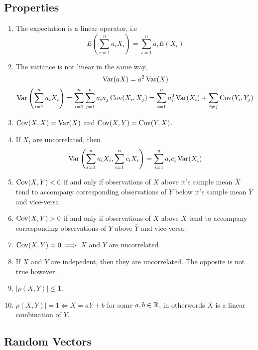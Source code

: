\subsection{Properties}
\begin{enumerate}[label=(\roman*)]
    \item The expectation is a linear operator, i.e 
    \[E\left(\sum_{i=1}^n a_iX_i\right) = \sum_{i=1}^n a_iE(X_i)\]
    \item The variance is not linear in the same way, 
    \[\operatorname{Var}(aX) = a^2\operatorname{Var}(X)\]
    \[\operatorname{Var}\left(\sum_{i=1}^n a_iX_i\right) = \sum_{i=1}^n\sum_{j=1}^n a_ia_j\operatorname{Cov}(X_i, X_j) =  \sum_{i=1}^na_i^2\operatorname{Var}(X_i) + \sum_{i\neq j}\operatorname{Cov}(Y_i,Y_j)\]
    \item $\operatorname{Cov}(X,X) = \operatorname{Var}(X)$ and $\operatorname{Cov}(X,Y) = \operatorname{Cov}(Y,X)$.
    \item If $X_i$ are uncorrelated, then 
    \[\operatorname{Var}\left(\sum_{i=1}^n a_iX_i, \sum_{i=1}^n c_iX_i\right) = \sum_{i=1}^na_ic_i\operatorname{Var}(X_i)\]
    \item $\operatorname{Cov}(X,Y) < 0$ if and only if observations of $X$ above it's sample mean $\bar{X}$ tend to accompany corresponding observations of $Y$ below it's sample mean $\bar{Y}$ and vice-versa. 
    \item $\operatorname{Cov}(X,Y) > 0$ if and only if observations of $X$ above $\bar{X}$ tend to accompany corresponding observations of $Y$ above $\bar{Y}$ and vice-versa. 
    \item $\operatorname{Cov}(X,Y) = 0 \implies$ $X$ and $Y$ are uncorrelated
    \item If $X$ and $Y$ are indepedent, then they are uncorrelated. The opposite is not true however. 
    \item $|\rho(X,Y)| \leq 1$. 
    \item $\rho(X,Y)| = 1 \iff X = aY + b$ for some $a,b \in \mathbb{R}$, in otherwords $X$ is a linear combination of $Y$.
\end{enumerate}

\subsection{Random Vectors}

